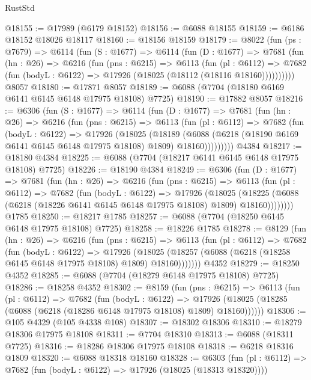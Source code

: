 \begin{lexlean}{RustStd}
\begin{coremodule}
@18155 := @17989 (@6179 @18152)
@18156 := @6088 @18155
@18159 := @6186 @18152 @18026 @18117
@18160 := @18156 @18159
@18179 := @8022
    (fun (ps : @7679) =>
    @6114
      (fun (S : @1677) =>
      @6114
        (fun (D : @1677) =>
        @7681
          (fun (hn : @26) =>
          @6216
            (fun (pns : @6215) =>
            @6113
              (fun (pl : @6112) =>
              @7682 (fun (bodyL : @6122) => @17926 (@18025 (@18112 (@18116 @18160))))))))))
    @8057
@18180 := @17871 @8057
@18189 := @6088 (@7704 (@18180 @6169 @6141 @6145 @6148 @17975 @18108) @7725)
@18190 := @17882 @8057
@18216 := @6306
    (fun (S : @1677) =>
    @6114
      (fun (D : @1677) =>
      @7681
        (fun (hn : @26) =>
        @6216
          (fun (pns : @6215) =>
          @6113
            (fun (pl : @6112) =>
            @7682
              (fun (bodyL : @6122) =>
              @17926
                (@18025
                  (@18189
                    (@6088
                      (@6218 (@18190 @6169 @6141 @6145 @6148 @17975 @18108) @1809)
                      @18160)))))))))
    @4384
@18217 := @18180 @4384
@18225 := @6088 (@7704 (@18217 @6141 @6145 @6148 @17975 @18108) @7725)
@18226 := @18190 @4384
@18249 := @6306
    (fun (D : @1677) =>
    @7681
      (fun (hn : @26) =>
      @6216
        (fun (pns : @6215) =>
        @6113
          (fun (pl : @6112) =>
          @7682
            (fun (bodyL : @6122) =>
            @17926
              (@18025
                (@18225 (@6088 (@6218 (@18226 @6141 @6145 @6148 @17975 @18108) @1809) @18160))))))))
    @1785
@18250 := @18217 @1785
@18257 := @6088 (@7704 (@18250 @6145 @6148 @17975 @18108) @7725)
@18258 := @18226 @1785
@18278 := @8129
    (fun (hn : @26) =>
    @6216
      (fun (pns : @6215) =>
      @6113
        (fun (pl : @6112) =>
        @7682
          (fun (bodyL : @6122) =>
          @17926
            (@18025 (@18257 (@6088 (@6218 (@18258 @6145 @6148 @17975 @18108) @1809) @18160)))))))
    @4352
@18279 := @18250 @4352
@18285 := @6088 (@7704 (@18279 @6148 @17975 @18108) @7725)
@18286 := @18258 @4352
@18302 := @8159
    (fun (pns : @6215) =>
    @6113
      (fun (pl : @6112) =>
      @7682
        (fun (bodyL : @6122) =>
        @17926 (@18025 (@18285 (@6088 (@6218 (@18286 @6148 @17975 @18108) @1809) @18160))))))
@18306 := @105 @4329 (@105 @4338 @108)
@18307 := @18302 @18306
@18310 := @18279 @18306 @17975 @18108
@18311 := @7704 @18310
@18313 := @6088 (@18311 @7725)
@18316 := @18286 @18306 @17975 @18108
@18318 := @6218 @18316 @1809
@18320 := @6088 @18318 @18160
@18328 := @6303
    (fun (pl : @6112) => @7682 (fun (bodyL : @6122) => @17926 (@18025 (@18313 @18320))))

\end{coremodule}
\end{lexlean}
